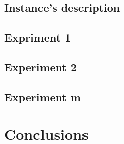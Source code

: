\subsection{Instance's description} \label{subsec:instances}


\subsection{Expriment 1}

\subsection{Experiment 2}

\subsection{Experiment m}


\section{Conclusions} \label{sec:conclusions}
